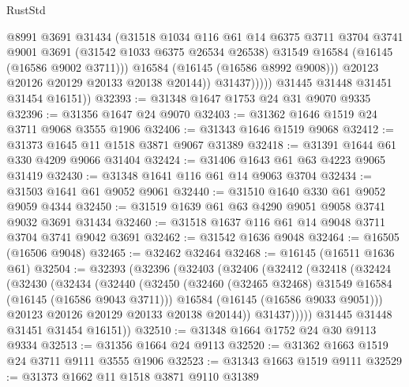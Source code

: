 \begin{lexlean}{RustStd}
\begin{coremodule}
                        @8991
                        @3691
                        @31434
                        (@31518
                          @1034
                          @116
                          @61
                          @14
                          @6375
                          @3711
                          @3704
                          @3741
                          @9001
                          @3691
                          (@31542 @1033 @6375 @26534 @26538)
                          @31549
                          @16584
                          (@16145 (@16586 @9002 @3711)))
                        @16584
                        (@16145 (@16586 @8992 @9008)))
                      @20123
                      @20126
                      @20129
                      @20133
                      @20138
                      @20144))
                  @31437)))))
        @31445
        @31448
        @31451
        @31454
        @16151))
@32393 := @31348 @1647 @1753 @24 @31 @9070 @9335
@32396 := @31356 @1647 @24 @9070
@32403 := @31362 @1646 @1519 @24 @3711 @9068 @3555 @1906
@32406 := @31343 @1646 @1519 @9068
@32412 := @31373 @1645 @11 @1518 @3871 @9067 @31389
@32418 := @31391 @1644 @61 @330 @4209 @9066 @31404
@32424 := @31406 @1643 @61 @63 @4223 @9065 @31419
@32430 := @31348 @1641 @116 @61 @14 @9063 @3704
@32434 := @31503 @1641 @61 @9052 @9061
@32440 := @31510 @1640 @330 @61 @9052 @9059 @4344
@32450 := @31519 @1639 @61 @63 @4290 @9051 @9058 @3741 @9032 @3691 @31434
@32460 := @31518 @1637 @116 @61 @14 @9048 @3711 @3704 @3741 @9042 @3691
@32462 := @31542 @1636 @9048
@32464 := @16505 (@16506 @9048)
@32465 := @32462 @32464
@32468 := @16145 (@16511 @1636 @61)
@32504 := @32393
    (@32396
      (@32403
        (@32406
          (@32412
            (@32418
              (@32424
                (@32430
                  (@32434
                    (@32440
                      (@32450
                        (@32460 (@32465 @32468) @31549 @16584 (@16145 (@16586 @9043 @3711)))
                        @16584
                        (@16145 (@16586 @9033 @9051)))
                      @20123
                      @20126
                      @20129
                      @20133
                      @20138
                      @20144))
                  @31437)))))
        @31445
        @31448
        @31451
        @31454
        @16151))
@32510 := @31348 @1664 @1752 @24 @30 @9113 @9334
@32513 := @31356 @1664 @24 @9113
@32520 := @31362 @1663 @1519 @24 @3711 @9111 @3555 @1906
@32523 := @31343 @1663 @1519 @9111
@32529 := @31373 @1662 @11 @1518 @3871 @9110 @31389

\end{coremodule}
\end{lexlean}
